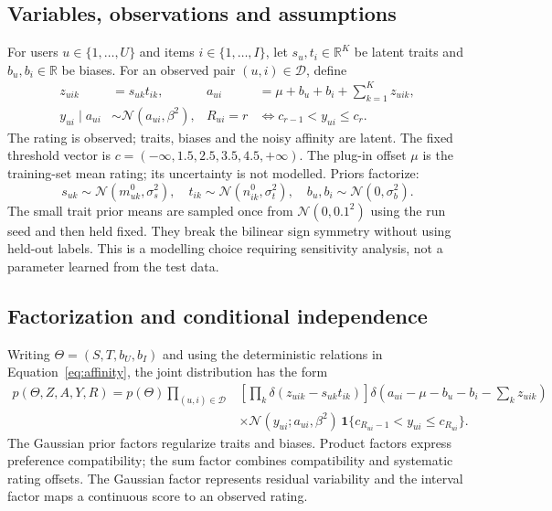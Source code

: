 \documentclass[11pt,a4paper]{article}
\newcommand{\N}{\mathcal N}
\begin{document}
\subsection{Variables, observations and assumptions}
For users $u\in\{1,\ldots,U\}$ and items $i\in\{1,\ldots,I\}$, let
$s_u,t_i\in\mathbb R^K$ be latent traits and $b_u,b_i\in\mathbb R$ be biases.
For an observed pair $(u,i)\in\mathcal D$, define
\begin{align}
z_{uik}&=s_{uk}t_{ik}, &
a_{ui}&=\mu+b_u+b_i+\sum_{k=1}^{K}z_{uik},\label{eq:affinity}\\
y_{ui}\mid a_{ui}&\sim\N(a_{ui},\beta^2), &
R_{ui}=r&\iff c_{r-1}<y_{ui}\leq c_r.\label{eq:ordinal}
\end{align}
The rating is observed; traits, biases and the noisy affinity are latent.
The fixed threshold vector is $c=(-\infty,1.5,2.5,3.5,4.5,+\infty)$.
The plug-in offset $\mu$ is the training-set mean rating; its uncertainty is not
modelled. Priors factorize:
\begin{equation}
s_{uk}\sim\N(m^0_{uk},\sigma_s^2),\quad
t_{ik}\sim\N(n^0_{ik},\sigma_t^2),\quad
b_u,b_i\sim\N(0,\sigma_b^2).
\end{equation}
The small trait prior means are sampled once from $\N(0,0.1^2)$ using the run
seed and then held fixed. They break the bilinear sign symmetry without using
held-out labels. This is a modelling choice requiring sensitivity analysis,
not a parameter learned from the test data.

\subsection{Factorization and conditional independence}
Writing $\Theta=(S,T,b_U,b_I)$ and using the deterministic relations in
Equation~\ref{eq:affinity}, the joint distribution has the form
\begin{equation}
\begin{aligned}
p(\Theta,Z,A,Y,R)=p(\Theta)\prod_{(u,i)\in\mathcal D}
&\left[\prod_k\delta(z_{uik}-s_{uk}t_{ik})\right]
\delta\!\left(a_{ui}-\mu-b_u-b_i-\sum_k z_{uik}\right)\\
&\times\N(y_{ui};a_{ui},\beta^2)\,
\mathbf1\{c_{R_{ui}-1}<y_{ui}\le c_{R_{ui}}\}.
\end{aligned}\label{eq:joint}
\end{equation}
The Gaussian prior factors regularize traits and biases. Product factors express
preference compatibility; the sum factor combines compatibility and systematic
rating offsets. The Gaussian factor represents residual variability and the
interval factor maps a continuous score to an observed rating.
\end{document}
